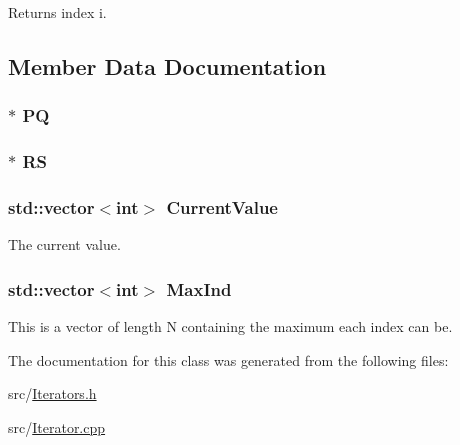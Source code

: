 Returns index i. 

\subsection{Member Data Documentation}
\hypertarget{classJKBuilder_1_1QuartetIterator_a84f5c3632fba19d3bb85e1cffb9e51f7}{
\subsubsection[{PQ}]{$\ast$ {\bf PQ}}}
\label{classJKBuilder_1_1QuartetIterator_a84f5c3632fba19d3bb85e1cffb9e51f7}
\hypertarget{classJKBuilder_1_1QuartetIterator_a26b777bf7ea22524f1cc725020ee2082}{
\subsubsection[{RS}]{$\ast$ {\bf RS}}}
\label{classJKBuilder_1_1QuartetIterator_a26b777bf7ea22524f1cc725020ee2082}
\hypertarget{classJKBuilder_1_1Iterator_a20ca24f6d827aba144bb087c4bcb74a0}{
\subsubsection[{CurrentValue}]{\setlength{\rightskip}{0pt plus 5cm}std::vector$<$int$>$ {\bf CurrentValue}}}
\label{classJKBuilder_1_1Iterator_a20ca24f6d827aba144bb087c4bcb74a0}


The current value. \hypertarget{classJKBuilder_1_1Iterator_ab6b56d3c4e9353bc938dd6249cde9ca0}{
\subsubsection[{MaxInd}]{\setlength{\rightskip}{0pt plus 5cm}std::vector$<$int$>$ {\bf MaxInd}}}
\label{classJKBuilder_1_1Iterator_ab6b56d3c4e9353bc938dd6249cde9ca0}


This is a vector of length N containing the maximum each index can be. 

The documentation for this class was generated from the following files:\begin{DoxyCompactItemize}
\item 
src/\hyperlink{Iterators_8h}{Iterators.h}\item 
src/\hyperlink{Iterator_8cpp}{Iterator.cpp}\end{DoxyCompactItemize}
